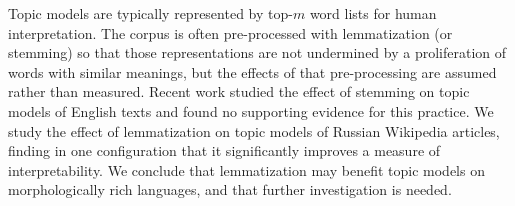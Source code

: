Topic models are typically represented by top-$m$ word lists for human interpretation.  The corpus is often pre-processed with lemmatization (or stemming) so that those representations are not undermined by a proliferation of words with similar meanings, but the effects of that pre-processing are assumed rather than measured.  Recent work studied the effect of stemming on topic models of English texts and found no supporting evidence for this practice.  We study the effect of lemmatization on topic models of Russian Wikipedia articles, finding in one configuration that it significantly improves a measure of interpretability.  We conclude that lemmatization may benefit topic models on morphologically rich languages, and that further investigation is needed.
